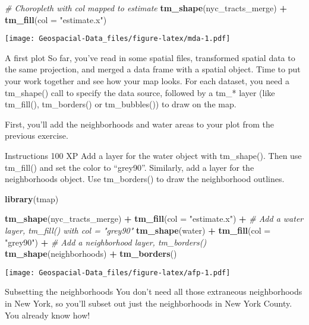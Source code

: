 \documentclass[]{article}
\newenvironment{Shaded}{\begin{snugshade}}{\end{snugshade}}
\newcommand{\CommentTok}[1]{\textcolor[rgb]{0.56,0.35,0.01}{\textit{#1}}}
\newcommand{\DataTypeTok}[1]{\textcolor[rgb]{0.13,0.29,0.53}{#1}}
\newcommand{\KeywordTok}[1]{\textcolor[rgb]{0.13,0.29,0.53}{\textbf{#1}}}
\newcommand{\NormalTok}[1]{#1}
\newcommand{\OperatorTok}[1]{\textcolor[rgb]{0.81,0.36,0.00}{\textbf{#1}}}
\newcommand{\StringTok}[1]{\textcolor[rgb]{0.31,0.60,0.02}{#1}}
\begin{document}
\begin{Shaded}
\begin{Highlighting}[]
\CommentTok{# Choropleth with col mapped to estimate}
\KeywordTok{tm_shape}\NormalTok{(nyc_tracts_merge) }\OperatorTok{+}
\StringTok{  }\KeywordTok{tm_fill}\NormalTok{(}\DataTypeTok{col =} \StringTok{"estimate.x"}\NormalTok{) }
\end{Highlighting}
\end{Shaded}

\texttt{[image: Geospacial-Data\_files/figure-latex/mda-1.pdf]}

A first plot So far, you've read in some spatial files, transformed
spatial data to the same projection, and merged a data frame with a
spatial object. Time to put your work together and see how your map
looks. For each dataset, you need a tm\_shape() call to specify the data
source, followed by a tm\_* layer (like tm\_fill(), tm\_borders() or
tm\_bubbles()) to draw on the map.

First, you'll add the neighborhoods and water areas to your plot from
the previous exercise.

Instructions 100 XP Add a layer for the water object with tm\_shape().
Then use tm\_fill() and set the color to ``grey90''. Similarly, add a
layer for the neighborhoods object. Use tm\_borders() to draw the
neighborhood outlines.

\begin{Shaded}
\begin{Highlighting}[]
\KeywordTok{library}\NormalTok{(tmap)}

\KeywordTok{tm_shape}\NormalTok{(nyc_tracts_merge) }\OperatorTok{+}
\StringTok{  }\KeywordTok{tm_fill}\NormalTok{(}\DataTypeTok{col =} \StringTok{"estimate.x"}\NormalTok{) }\OperatorTok{+}
\StringTok{  }\CommentTok{# Add a water layer, tm_fill() with col = "grey90"}
\StringTok{  }\KeywordTok{tm_shape}\NormalTok{(water) }\OperatorTok{+}
\StringTok{  }\KeywordTok{tm_fill}\NormalTok{(}\DataTypeTok{col =} \StringTok{"grey90"}\NormalTok{) }\OperatorTok{+}
\StringTok{  }\CommentTok{# Add a neighborhood layer, tm_borders()}
\StringTok{  }\KeywordTok{tm_shape}\NormalTok{(neighborhoods) }\OperatorTok{+}
\StringTok{  }\KeywordTok{tm_borders}\NormalTok{() }
\end{Highlighting}
\end{Shaded}

\texttt{[image: Geospacial-Data\_files/figure-latex/afp-1.pdf]}

Subsetting the neighborhoods You don't need all those extraneous
neighborhoods in New York, so you'll subset out just the neighborhoods
in New York County. You already know how!
\end{document}
